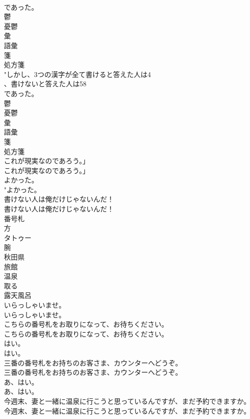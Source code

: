 \documentclass[8pt]{extreport}
\begin{document}
\begin{CJK}{UTF8}{min}
\\	であった。	
\\	鬱 
\\	憂鬱 
\\	彙 
\\	語彙 
\\	箋 
\\	処方箋 
\\	"しかし、3つの漢字が全て書けると答えた人は4
\\	、書けないと答えた人は58
\\	であった。 
\\	鬱 
\\	憂鬱 
\\	彙 
\\	語彙 
\\	箋 
\\	処方箋 
\\	これが現実なのであろう。」	
\\	これが現実なのであろう。」 
\\	よかった。	
\\	"よかった。 
\\	書けない人は俺だけじゃないんだ！	
\\	書けない人は俺だけじゃないんだ！ 
\\	番号札
\\	方
\\	タトゥー
\\	腕
\\	秋田県
\\	旅館
\\	温泉
\\	取る
\\	露天風呂
\\	いらっしゃいませ。	
\\	いらっしゃいませ。 
\\	こちらの番号札をお取りになって、お待ちください。	
\\	こちらの番号札をお取りになって、お待ちください。 
\\	はい。	
\\	はい。 
\\	三番の番号札をお持ちのお客さま、カウンターへどうぞ。	
\\	三番の番号札をお持ちのお客さま、カウンターへどうぞ。 
\\	あ、はい。	
\\	あ、はい。 
\\	今週末、妻と一緒に温泉に行こうと思っているんですが、まだ予約できますか。	
\\	今週末、妻と一緒に温泉に行こうと思っているんですが、まだ予約できますか。 

\end{CJK}
\end{document}
